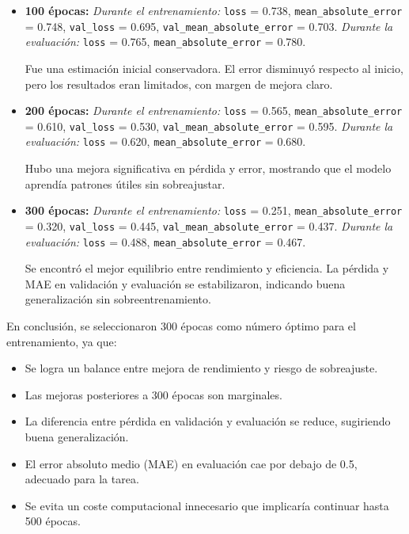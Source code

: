 \documentclass[conference,a4paper]{IEEEtran}
\begin{document}
\begin{itemize}
\begin{itemize}
        \item \textbf{100 épocas:}  
        \textit{Durante el entrenamiento:}  
        \texttt{loss} = 0.738, \texttt{mean\_absolute\_error} = 0.748,  
        \texttt{val\_loss} = 0.695, \texttt{val\_mean\_absolute\_error} = 0.703.  
        \textit{Durante la evaluación:}  
        \texttt{loss} = 0.765, \texttt{mean\_absolute\_error} = 0.780.

        Fue una estimación inicial conservadora. El error disminuyó respecto al inicio, pero los resultados eran limitados, con margen de mejora claro.

        \item \textbf{200 épocas:}  
        \textit{Durante el entrenamiento:}  
        \texttt{loss} = 0.565, \texttt{mean\_absolute\_error} = 0.610,  
        \texttt{val\_loss} = 0.530, \texttt{val\_mean\_absolute\_error} = 0.595.  
        \textit{Durante la evaluación:}  
        \texttt{loss} = 0.620, \texttt{mean\_absolute\_error} = 0.680.

        Hubo una mejora significativa en pérdida y error, mostrando que el modelo aprendía patrones útiles sin sobreajustar.

        \item \textbf{300 épocas:}  
        \textit{Durante el entrenamiento:}  
        \texttt{loss} = 0.251, \texttt{mean\_absolute\_error} = 0.320,  
        \texttt{val\_loss} = 0.445, \texttt{val\_mean\_absolute\_error} = 0.437.  
        \textit{Durante la evaluación:}  
        \texttt{loss} = 0.488, \texttt{mean\_absolute\_error} = 0.467.

        Se encontró el mejor equilibrio entre rendimiento y eficiencia. La pérdida y MAE en validación y evaluación se estabilizaron, indicando buena generalización sin sobreentrenamiento.
    \end{itemize}

    En conclusión, se seleccionaron 300 épocas como número óptimo para el entrenamiento, ya que:
    \begin{itemize}
        \item Se logra un balance entre mejora de rendimiento y riesgo de sobreajuste.
        \item Las mejoras posteriores a 300 épocas son marginales.
        \item La diferencia entre pérdida en validación y evaluación se reduce, sugiriendo buena generalización.
        \item El error absoluto medio (MAE) en evaluación cae por debajo de 0.5, adecuado para la tarea.
        \item Se evita un coste computacional innecesario que implicaría continuar hasta 500 épocas.
    \end{itemize}


\end{itemize}
\end{document}
